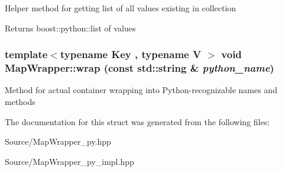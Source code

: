 \label{struct_stl_containers_wrappers_1_1_map_wrapper_af5fe4cddbd02adae4a550258a397e6a0}
Helper method for getting list of all values existing in collection \begin{DoxyReturn}{Returns}
boost::python::list of values 
\end{DoxyReturn}
\hypertarget{struct_stl_containers_wrappers_1_1_map_wrapper_a1ac7d22751e4a35f84b5c0d5d764529b}{
\subsubsection[{wrap}]{\setlength{\rightskip}{0pt plus 5cm}template$<$typename Key , typename V $>$ void MapWrapper::wrap (const std::string \& {\em python\_\-name})}}
\label{struct_stl_containers_wrappers_1_1_map_wrapper_a1ac7d22751e4a35f84b5c0d5d764529b}
Method for actual container wrapping into Python-\/recognizable names and methods 

The documentation for this struct was generated from the following files:\begin{DoxyCompactItemize}
\item 
Source/MapWrapper\_\-py.hpp\item 
Source/MapWrapper\_\-py\_\-impl.hpp\end{DoxyCompactItemize}
